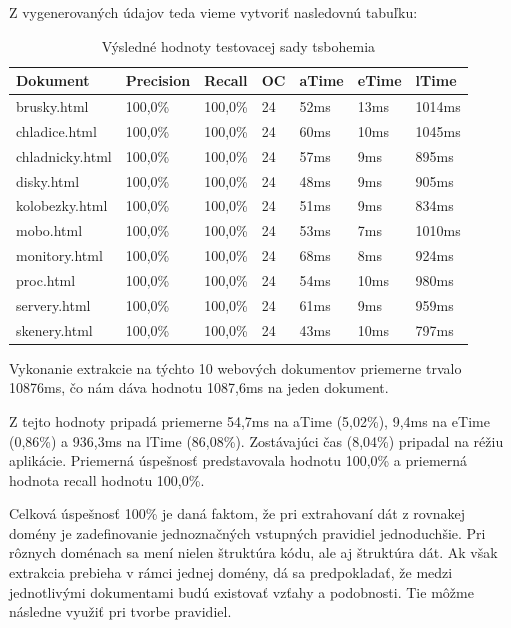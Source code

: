 \bigskip

Z vygenerovaných údajov teda vieme vytvoriť nasledovnú tabuľku:

\begin{table}[hbt]
\caption{Výsledné hodnoty testovacej sady tsbohemia}
\centering
\begin{tabular}{|l|l|l|l|l|l|l|}
\hline
\textbf{Dokument}          & \textbf{Precision} & \textbf{Recall}  & \textbf{OC}  & \textbf{aTime} & \textbf{eTime} & \textbf{lTime}  \\ \hline
brusky.html     & 100,0\%   & 100,0\% & 24 & 52ms  & 13ms  & 1014ms \\ \hline
chladice.html   & 100,0\%   & 100,0\% & 24 & 60ms  & 10ms  & 1045ms \\ \hline
chladnicky.html & 100,0\%   & 100,0\% & 24 & 57ms  & 9ms   & 895ms  \\ \hline
disky.html      & 100,0\%   & 100,0\% & 24 & 48ms  & 9ms   & 905ms  \\ \hline
kolobezky.html  & 100,0\%   & 100,0\% & 24 & 51ms  & 9ms   & 834ms  \\ \hline
mobo.html       & 100,0\%   & 100,0\% & 24 & 53ms  & 7ms   & 1010ms \\ \hline
monitory.html   & 100,0\%   & 100,0\% & 24 & 68ms  & 8ms   & 924ms  \\ \hline
proc.html       & 100,0\%   & 100,0\% & 24 & 54ms  & 10ms  & 980ms  \\ \hline
servery.html    & 100,0\%   & 100,0\% & 24 & 61ms  & 9ms   & 959ms  \\ \hline
skenery.html    & 100,0\%   & 100,0\% & 24 & 43ms  & 10ms  & 797ms  \\ \hline
\end{tabular}
\end{table}

Vykonanie extrakcie na týchto 10 webových dokumentov priemerne trvalo 10876ms, čo nám dáva hodnotu 1087,6ms na jeden dokument. 

Z tejto hodnoty pripadá priemerne 54,7ms na aTime (5,02\%), 9,4ms na eTime (0,86\%) a 936,3ms na lTime (86,08\%). Zostávajúci čas (8,04\%) pripadal na réžiu aplikácie. Priemerná úspešnosť predstavovala hodnotu 100,0\% a priemerná hodnota recall hodnotu 100,0\%. 

\bigskip

Celková úspešnosť 100\% je daná faktom, že pri extrahovaní dát z rovnakej domény je zadefinovanie jednoznačných vstupných pravidiel jednoduchšie. Pri rôznych doménach sa mení nielen štruktúra kódu, ale aj štruktúra dát. Ak však extrakcia prebieha v rámci jednej domény, dá sa predpokladať, že medzi jednotlivými dokumentami budú existovať vzťahy a podobnosti. Tie môžme následne využiť pri tvorbe pravidiel.

